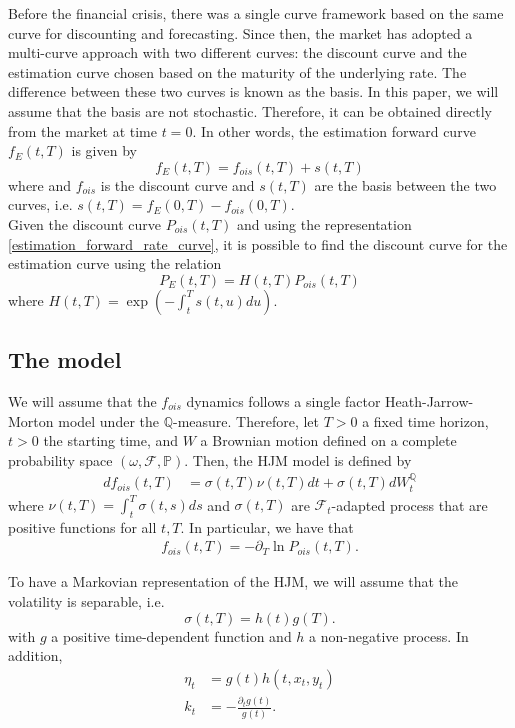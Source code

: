 \documentclass[a4paper,10pt]{article}
\newcommand{\1}{\mathbf{1}}
\begin{document}
Before the financial crisis, there was a single curve framework based on the same curve for discounting and forecasting. Since then, the market has adopted a multi-curve approach with two different curves: the discount curve and the estimation curve chosen based on the maturity of the underlying rate. The difference between these two curves is known as the basis. In this paper, we will assume that the basis are not stochastic. Therefore, it can be obtained directly from the market at time $t=0$. In other words, the estimation forward curve $f_{E}(t, T)$ is given by
\begin{equation}\label{estimation_forward_rate_curve}
f_{E}(t,T) = f_{ois}(t,T) + s(t,T)
\end{equation}
where and $f_{ois}$ is the discount curve and $s(t,T)$ are the basis between the two curves, i.e. $s(t,T)= f_{E}(0,T) - f_{ois}(0,T)$.\\

Given the discount curve $P_{ois}(t,T)$ and using the representation \eqref{estimation_forward_rate_curve}, it is possible to find the discount curve for the estimation curve using the relation
\begin{equation}\label{bond_forward}
P_{E}(t,T)=H(t,T)P_{ois}(t,T)
\end{equation}
where $H(t,T)=\exp\left(-\int_{t}^{T}s(t,u) du \right)$.

\subsection{The model}
We will assume that the $f_{ois}$ dynamics follows a single factor Heath-Jarrow-Morton model under the $\mathbb{Q}$-measure. Therefore, let $T>0$ a fixed time horizon, $t>0$ the starting time, and $W$ a Brownian motion defined on a complete probability space $(\omega, \mathcal{F}, \mathbb{P})$. Then, the HJM model is defined by
\begin{align}\label{ois_forward_rate_curve}
df_{ois}(t,T) &= \sigma(t,T)\nu(t,T)dt + \sigma(t,T)dW^{\mathbb{Q}}_t
\end{align}
where $\nu(t,T)=\int_{t}^{T}\sigma(t,s)ds$ and $\sigma(t, T)$ are $\mathcal{F}_{t}$-adapted process that are positive functions for all $t,T$. In particular, we have that
\begin{eqnarray*}
f_{ois}(t,T)= -\partial_{T}\ln P_{ois}(t,T).
\end{eqnarray*}

To have a Markovian representation of the HJM, we will assume that the volatility is separable, i.e.
\begin{equation}\label{separation_condition}
\sigma(t,T)= h(t)g(T).
\end{equation}
with $g$ a positive time-dependent function and $h$ a non-negative process. In addition,
\begin{align*}
\eta_t &= g(t)h(t,x_t,y_t)  \nonumber \\
k_t &= - \frac{\partial_t g(t)}{g(t)}.
\end{align*}
\end{document}
